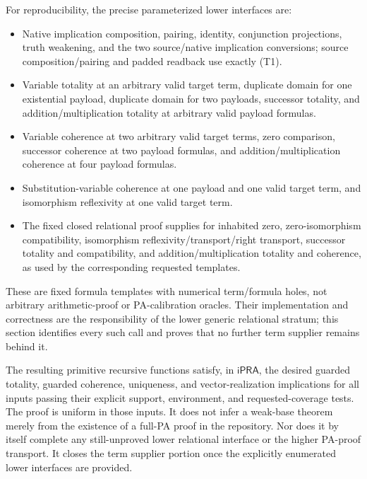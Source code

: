 For reproducibility, the precise parameterized lower interfaces are:
\begin{itemize}
\item Native implication composition, pairing, identity, conjunction
      projections, truth weakening, and the two source/native
      implication conversions; source composition/pairing and padded
      readback use exactly (T1).
\item Variable totality at an arbitrary valid target term, duplicate
      domain for one existential payload, duplicate domain for two
      payloads, successor totality, and addition/multiplication totality
      at arbitrary valid payload formulas.
\item Variable coherence at two arbitrary valid target terms,
      zero comparison, successor coherence at two payload formulas,
      and addition/multiplication coherence at four payload formulas.
\item Substitution-variable coherence at one payload and one valid
      target term, and isomorphism reflexivity at one valid target term.
\item The fixed closed relational proof supplies for inhabited zero,
      zero-isomorphism compatibility, isomorphism reflexivity/transport/right transport, successor
      totality and compatibility, and addition/multiplication totality
      and coherence, as used by the corresponding requested templates.
\end{itemize}
These are fixed formula templates with numerical term/formula holes,
not arbitrary arithmetic-proof or PA-calibration oracles.  Their
implementation and correctness are the responsibility of the lower
generic relational stratum; this section identifies every such call
and proves that no further term supplier remains behind it.

The resulting primitive recursive functions satisfy, in
$\mathsf{iPRA}$, the desired guarded totality, guarded coherence,
uniqueness, and vector-realization implications for all inputs passing
their explicit support, environment, and requested-coverage tests.
The proof is uniform in those inputs.  It does not infer a weak-base
theorem merely from the existence of a full-PA proof in the repository.
Nor does it by itself complete any still-unproved lower relational
interface or the higher PA-proof transport.  It closes the term
supplier portion once the explicitly enumerated lower interfaces are
provided.
